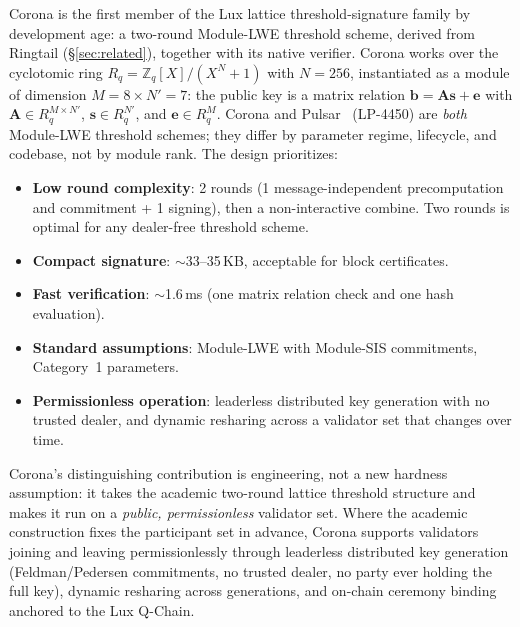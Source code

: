 Corona is the first member of the Lux lattice threshold-signature family by development
age: a two-round Module-LWE threshold scheme, derived from Ringtail (\S\ref{sec:related}),
together with its native verifier. Corona works over the cyclotomic ring
$R_q = \mathbb{Z}_q[X]/(X^N + 1)$ with $N = 256$, instantiated as a module of dimension
$M = 8 \times N' = 7$: the public key is a matrix relation
$\mathbf{b} = \mathbf{A}\mathbf{s} + \mathbf{e}$ with $\mathbf{A} \in R_q^{M \times N'}$,
$\mathbf{s} \in R_q^{N'}$, and $\mathbf{e} \in R_q^{M}$. Corona and Pulsar~\cite{pulsar}
(LP-4450) are \emph{both} Module-LWE threshold schemes; they differ by parameter regime,
lifecycle, and codebase, not by module rank. The design prioritizes:
\begin{itemize}[nosep]
\item \textbf{Low round complexity}: 2 rounds (1 message-independent precomputation and commitment + 1 signing), then a non-interactive combine. Two rounds is optimal for any dealer-free threshold scheme.
\item \textbf{Compact signature}: $\sim$33--35\,KB, acceptable for block certificates.
\item \textbf{Fast verification}: $\sim$1.6\,ms (one matrix relation check and one hash evaluation).
\item \textbf{Standard assumptions}: Module-LWE with Module-SIS commitments, Category~1 parameters.
\item \textbf{Permissionless operation}: leaderless distributed key generation with no trusted dealer, and dynamic resharing across a validator set that changes over time.
\end{itemize}

Corona's distinguishing contribution is engineering, not a new hardness assumption: it
takes the academic two-round lattice threshold structure and makes it run on a
\emph{public, permissionless} validator set. Where the academic construction fixes the
participant set in advance, Corona supports validators joining and leaving
permissionlessly through leaderless distributed key generation (Feldman/Pedersen
commitments, no trusted dealer, no party ever holding the full key), dynamic resharing
across generations, and on-chain ceremony binding anchored to the Lux Q-Chain.

